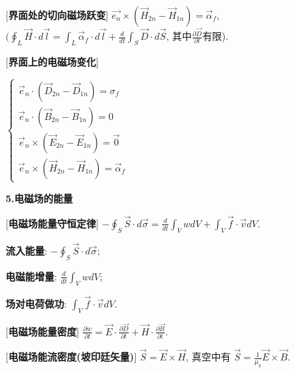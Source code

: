 [\textbf{界面处的切向磁场跃变}] $\vec{e_n}\times(\vec H_{2n}-\vec H_{1n})=\vec\alpha_f$, $(\oint_L\vec H\cdot d\vec l=\int_L\vec\alpha_f\cdot d\vec l+\frac{d}{dt}\int_S\vec D\cdot d\vec S$, 其中$\frac{\partial \vec D}{\partial t}$有限).\par

[\textbf{界面上的电磁场变化}]\par
\qquad $\begin{cases}\vec e_n\cdot(\vec D_{2n}-\vec D_{1n})=\sigma_f\\\vec e_n\cdot(\vec B_{2n}-\vec B_{1n})=0\\\vec e_n\times(\vec E_{2n}-\vec E_{1n})=\vec 0\\\vec e_n\times(\vec H_{2n}-\vec H_{1n})=\vec \alpha_f\end{cases}$

\clearpage

\begin{center}
 \textbf{5.电磁场的能量}
\end{center}

[\textbf{电磁场能量守恒定律}] $-\oint_S\vec S\cdot d\vec\sigma=\frac{d}{dt}\int_V w dV+\int_V\vec f\cdot\vec vdV$.\par
\qquad \textbf{流入能量}: $-\oint_S\vec S\cdot d\vec\sigma$;\par
\qquad \textbf{电磁能增量}: $\frac{d}{dt}\int_V w dV$;\par
\qquad \textbf{场对电荷做功}: $\int_V\vec f\cdot\vec vdV$.\par

[\textbf{电磁场能量密度}] $\frac{\partial w}{\partial t}=\vec E\cdot\frac{\partial\vec D}{\partial t}+\vec H\cdot\frac{\partial \vec B}{\partial t}$.\par

[\textbf{电磁场能流密度(坡印廷矢量)}] $\vec S=\vec E\times\vec H$, 真空中有 $\vec S = \frac{1}{\mu_0}\vec E\times\vec B$.\par

